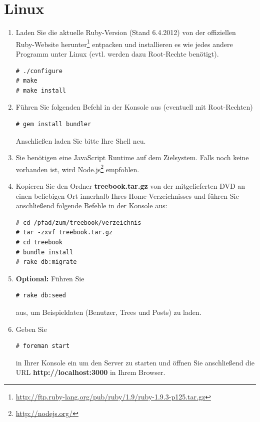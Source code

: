 \documentclass[10pt,a4paper]{book}
\begin{document}
\section{Linux}
\begin{enumerate}
\item Laden Sie die aktuelle Ruby-Version (Stand 6.4.2012) von der offiziellen Ruby-Website herunter\footnote{\href{http://ftp.ruby-lang.org/pub/ruby/1.9/ruby-1.9.3-p125.tar.gz}{http://ftp.ruby-lang.org/pub/ruby/1.9/ruby-1.9.3-p125.tar.gz}} entpacken und installieren es wie jedes andere Programm unter Linux (evtl. werden dazu Root-Rechte benötigt).
\lstset{language=bash}
\begin{lstlisting}
# ./configure
# make
# make install
\end{lstlisting}
\item Führen Sie folgenden Befehl in der Konsole aus (eventuell mit Root-Rechten)
\begin{lstlisting}
# gem install bundler
\end{lstlisting}
Anschließen laden Sie bitte Ihre Shell neu.
\item Sie benötigen eine JavaScript Runtime auf dem Zielsystem. Falls noch keine vorhanden ist, wird Node.js\footnote{\href{http://nodejs.org/}{http://nodejs.org/}} empfohlen.
\item Kopieren Sie den Ordner \textbf{treebook.tar.gz} von der mitgelieferten DVD an einen beliebigen Ort innerhalb Ihres Home-Verzeichnisses und führen Sie anschließend folgende Befehle in der Konsole aus:
\begin{lstlisting}
# cd /pfad/zum/treebook/verzeichnis
# tar -zxvf treebook.tar.gz
# cd treebook
# bundle install
# rake db:migrate
\end{lstlisting}
\item \textbf{Optional:} Führen Sie
\begin{lstlisting}
# rake db:seed
\end{lstlisting}
aus, um Beispieldaten (Benutzer, Trees und Posts) zu laden.
\item Geben Sie
\begin{lstlisting}
# foreman start
\end{lstlisting}
in Ihrer Konsole ein um den Server zu starten und öffnen Sie anschließend die URL \textbf{http://localhost:3000} in Ihrem Browser.
\end{enumerate}
\end{document}

